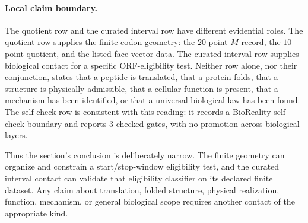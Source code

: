\paragraph{Local claim boundary.}
The quotient row and the curated interval row have different evidential roles. The quotient row supplies the finite codon geometry: the $20$-point $M$ record, the $10$-point quotient, and the listed face-vector data. The curated interval row supplies biological contact for a specific ORF-eligibility test. Neither row alone, nor their conjunction, states that a peptide is translated, that a protein folds, that a structure is physically admissible, that a cellular function is present, that a mechanism has been identified, or that a universal biological law has been found. The self-check row is consistent with this reading: it records a BioReality self-check boundary and reports $3$ checked gates, with no promotion across biological layers.

Thus the section's conclusion is deliberately narrow. The finite geometry can organize and constrain a start/stop-window eligibility test, and the curated interval contact can validate that eligibility classifier on its declared finite dataset. Any claim about translation, folded structure, physical realization, function, mechanism, or general biological scope requires another contact of the appropriate kind.